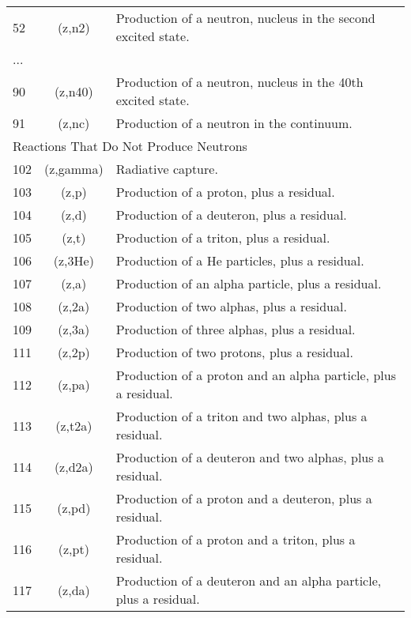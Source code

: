 \begin{table}[h]
\begin{tabular}{| l | c | l |}
52	& (z,n2)	& Production of a neutron, nucleus in the second excited state.	\\
... & & \\
90	& (z,n40) &	Production of a neutron, nucleus in the 40th excited state.	\\
91	& (z,nc)	& Production of a neutron in the continuum.	\\
\hline
\multicolumn{3}{l}{Reactions That Do Not Produce Neutrons}\\
\hline
102	& (z,gamma) &	Radiative capture.	\\
103	& (z,p)	   & Production of a proton, plus a residual.          \\
104	& (z,d)	   & Production of a deuteron, plus a residual.        \\
105	& (z,t)	   & Production of a triton, plus a residual.          \\
106	& (z,3He)	&    Production of a He particles, plus a residual.  \\
107	& (z,a)	  &  Production of an alpha particle, plus a residual. \\
108	& (z,2a)	& Production of two alphas, plus a residual.	\\
109	& (z,3a)	& Production of three alphas, plus a residual.	\\
111	& (z,2p)	& Production of two protons, plus a residual.	\\
112	& (z,pa)	& Production of a proton and an alpha particle, plus a residual.	\\
113	& (z,t2a)	& Production of a triton and two alphas, plus a residual.	\\
114	& (z,d2a)	& Production of a deuteron and two alphas, plus a residual.	\\
115	& (z,pd)	& Production of a proton and a deuteron, plus a residual.	\\
116	& (z,pt)	& Production of a proton and a triton, plus a residual.	\\
117	& (z,da)	& Production of a deuteron and an alpha particle, plus a residual.	\\
\hline
\end{tabular}
\end{table}
